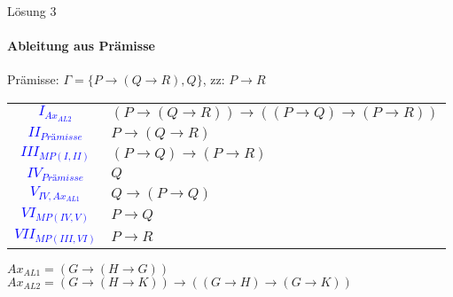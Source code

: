 \begin{frame}{Lösung 3}
	\framesubtitle{Ableitung aus Prämisse}
	Prämisse: $\Gamma =\{P\rightarrow(Q\rightarrow R), Q\}$, zz: $P\rightarrow R$\\
	\begin{tabular}{cl}
		\textcolor{blue}{$I_{Ax_{AL2}}$}      & $(P\rightarrow(Q\rightarrow R))\rightarrow((P\rightarrow Q)\rightarrow(P\rightarrow R))$ \\
		\textcolor{blue}{$II_{Prämisse}$}     & $P\rightarrow(Q\rightarrow R)$                                                           \\
		\textcolor{blue}{$III_{MP(I, II)}$}   & $(P\rightarrow Q)\rightarrow(P\rightarrow R)$                                            \\
		\textcolor{blue}{$IV_{Prämisse}$}     & $Q$                                                                                      \\
		\textcolor{blue}{$V_{IV, Ax_{AL1}}$}  & $Q\rightarrow(P\rightarrow Q)$                                                           \\
		\textcolor{blue}{$VI_{MP(IV, V)}$}    & $P\rightarrow Q$                                                                         \\
		\textcolor{blue}{$VII_{MP(III, VI)}$} & $P\rightarrow R$                                                                         \\
	\end{tabular}
	$Ax_{AL1} = (G\rightarrow(H\rightarrow G))$\\
	$Ax_{AL2} = (G\rightarrow(H\rightarrow K))\rightarrow((G\rightarrow H)\rightarrow(G\rightarrow K))$\\
\end{frame}
